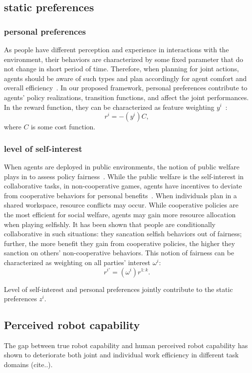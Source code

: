 \documentclass[letterpaper, 10 pt, conference]{ieeeconf}  %
\begin{document}
\subsection{static preferences}
\subsubsection{personal preferences}
As people have different perception and experience in interactions with the 
environment, their behaviors are characterized by some fixed parameter that 
do not change in short period of time. Therefore, when planning for joint 
actions, agents should be aware of such types and plan accordingly for agent 
comfort and overall efficiency~\cite{gombolay2015coordination}. In our 
proposed framework, personal preferences contribute to agents' policy 
realizations, transition functions, and affect the joint performances. In the 
reward function, they can be characterized as feature weighting $y^i$~\cite{dorsa2017active}:
\begin{equation}
  r^i = -(y^i)C, 
\end{equation}
where $C$ is some cost function.
\subsubsection{level of self-interest}
When agents are deployed in public environments, the notion of public welfare 
plays in to assess policy fairness~\cite{fehr2004social}. While the public welfare is the 
self-interest in collaborative tasks, in non-cooperative games, agents have incentives to 
deviate from cooperative behaviors for personal benefits~\cite{fujiwara2015non}.  
When individuals plan in a shared workspace, resource conflicts may occur. 
While cooperative policies are the most efficient for social welfare, agents 
may gain more resource allocation when playing selfishly. It has been shown 
that people are conditionally collaborative in such situations: they sancation 
selfish behaviors out of fairness; further, the more benefit they gain from 
cooperative policies, the higher they sanction on others' non-cooperative 
behaviors. This notion of fairness can be characterized as weighting on all 
parties' interest $\omega^i$:
\begin{equation}
  r^{i'} = (\omega^i) r^{1:k}.
\end{equation}

Level of self-interest and personal preferences jointly contribute to the 
static preferences $z^i$.
\subsection{Perceived robot capability}
The gap between true robot capability and human perceived robot capability  
has shown to deteriorate both joint and individual work efficiency in 
different task domains (cite..). 
\end{document}
